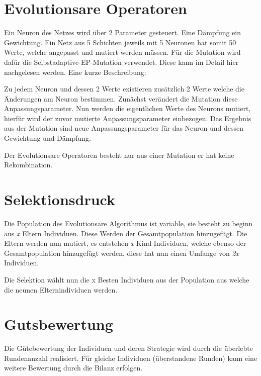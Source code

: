 \section{Evolutionsare Operatoren}
Ein Neuron des Netzes wird über 2 Parameter gesteuert. Eine Dämpfung ein Gewichtung. Ein Netz aus 5 Schichten jeweils mit 5 Neuronen hat somit 50 Werte, welche angepasst und mutiert werden müssen. Für die Mutation wird dafür die Selbstadaptive-EP-Mutation verwendet. Diese kann im Detail hier \citep[S.146]{Weicker2007} nachgelesen werden. Eine kurze Beschreibung:

Zu jedem Neuron und dessen 2 Werte existieren zusätzlich 2 Werte welche die Änderungen am Neuron bestimmen. Zunächst verändert die Mutation diese Anpassungsparameter. Nun werden die eigentlichen Werte des Neurons mutiert, hierfür wird der zuvor mutierte Anpassungsparameter einbezogen. Das Ergebnis aus der Mutation sind neue Anpassungsparameter für das Neuron und dessen Gewichtung und Dämpfung.

Der Evolutionsare Operatoren besteht nur aus einer Mutation er hat keine Rekombination.

\section{Selektionsdruck}
Die Population des Evolutionsare Algorithmus ist variable, sie besteht zu beginn aus \textit{x} Eltern Individuen. Diese Werden der Gesamtpopulation hinzugefügt. Die Eltern werden nun mutiert, es entstehen \textit{x} Kind Individuen, welche ebenso der Gesamtpopulation hinzugefügt werden, diese hat nun einen Umfange von \textit{2x} Individuen.

Die Selektion wählt nun die x Besten Individuen aus der Population aus welche die neunen Elternindividuen werden.

\section{Gutsbewertung}
Die Gütebewertung der Individuen und deren Strategie wird durch die überlebte Rundenanzahl realisiert. Für gleiche Individuen (überstandene Runden) kann eine weitere Bewertung durch die Bilanz erfolgen.


